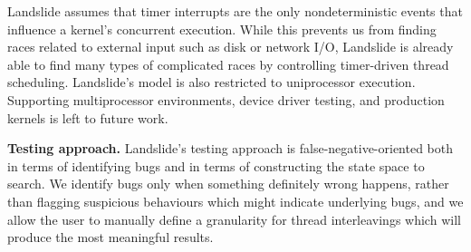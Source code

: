 \documentclass{llncs}
\begin{document}
Landslide assumes that timer interrupts are the only nondeterministic events that influence a kernel's concurrent execution. While this prevents us from finding races related to external input such as disk or network I/O, Landslide is already able to find many types of complicated races by controlling timer-driven thread scheduling.
Landslide's model is also restricted to uniprocessor execution. Supporting multiprocessor environments, device driver testing, and production kernels is left to future work.


{\bf Testing approach.} Landslide's testing approach is false-negative-oriented both in terms of identifying bugs and in terms of constructing the state space to search. 
We identify bugs only when something definitely wrong happens, rather than flagging suspicious behaviours which might indicate underlying bugs, and we allow the user to manually define a granularity for thread interleavings which will produce the most meaningful results.



\end{document}

